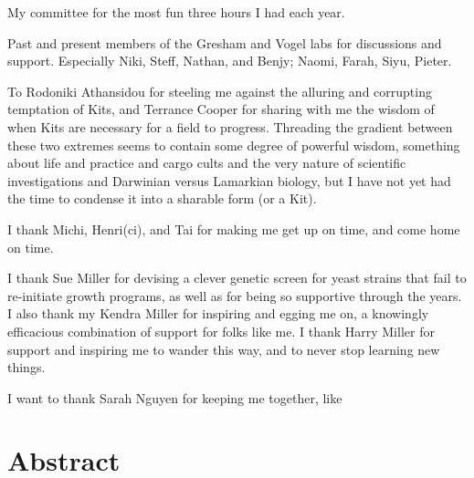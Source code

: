 \documentclass[12pt,letterpaper]{memoir}
\begin{document}
My committee for the most fun three hours I had each year.

Past and present members of the Gresham and Vogel labs for 
discussions and support.
Especially Niki, Steff, Nathan, and Benjy; Naomi, Farah, Siyu,
Pieter.

To Rodoniki Athansidou for steeling me against the alluring
and corrupting temptation of Kits, and Terrance Cooper for sharing
with me the wisdom of when Kits are necessary for a field to
progress. Threading the gradient between these two extremes seems to
contain some degree of powerful wisdom, something about life and
practice and cargo cults and the very nature of scientific
investigations and Darwinian versus Lamarkian biology, but I have 
not yet had the time to condense it into a sharable form (or a Kit).

I thank Michi, Henri(ci), and Tai for making me get up on time,
and come home on time.

I thank Sue Miller for devising a clever genetic screen for yeast
strains that fail to re-initiate growth programs, as well as for
being so supportive through the years.
I also thank my Kendra Miller for inspiring and egging me on, 
a knowingly efficacious combination of support for folks like me.
I thank Harry Miller for support and inspiring me to wander this way,
and to never stop learning new things.

I want to thank Sarah Nguyen for keeping me together, like 


\fi

\newpage
\pagestyle{plain}

\section*{Abstract}
\vspace{-0.5em}
\end{document}
